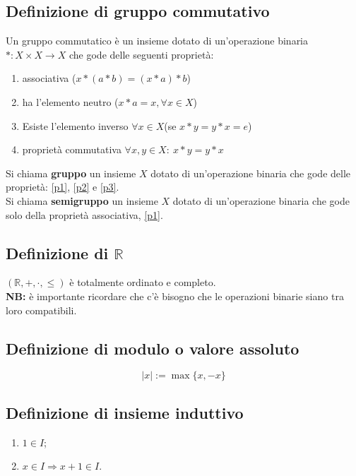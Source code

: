 \documentclass{article}
\begin{document}
\subsection{Definizione di gruppo commutativo} Un gruppo commutatico è un insieme dotato di un'operazione binaria $ * : X \times X \rightarrow X$ che gode delle seguenti proprietà:
	\begin{enumerate}
		\item \label{p1} associativa ($x * (a*b)= (x*a)*b$)
		\item \label{p2} ha l'elemento neutro ($x*a =x, \forall x \in X$)
		\item \label{p3} Esiste l'elemento inverso $\forall x \in X$(se $x*y= y*x=e$)
		\item \label{p4} proprietà commutativa $\forall x,y \in X: \ x*y= y*x$

	\end{enumerate}

Si chiama \textbf{gruppo} un insieme $X$ dotato di un'operazione binaria che gode delle proprietà: \autoref{p1}, \autoref{p2} e \autoref{p3}.\\

Si chiama \textbf{semigruppo} un insieme $X$ dotato di un'operazione binaria che gode solo della proprietà associativa, \autoref{p1}. \\

\subsection{Definizione di $\mathbb{R}$} $(\mathbb{R},+,\cdot,\leq)$ è totalmente ordinato e completo.\\
\indent \textbf{NB:} è importante ricordare che c'è bisogno che le operazioni binarie siano tra loro compatibili.

\subsection{Definizione di modulo o valore assoluto}
	\begin{equation}
		|x|:= \max\{x, -x\}
	\end{equation}


\subsection{Definizione di insieme induttivo}
\begin{enumerate}
	\item $1 \in I$;
	\item $x \in I \Rightarrow x+1 \in I $.

\end{enumerate}
\end{document}
